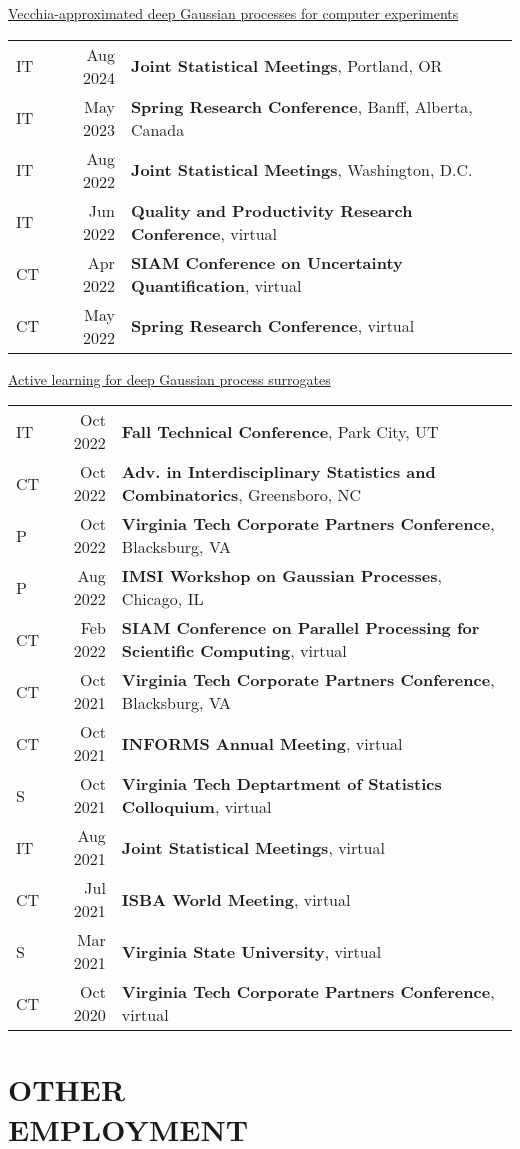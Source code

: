 \documentclass[margin,line,11pt]{res}
\begin{document}
\begin{resume}
\underline{Vecchia-approximated deep Gaussian processes for computer experiments}\\
\begin{tabular}{lrl}
IT & Aug 2024 & {\bf Joint Statistical Meetings}, Portland, OR \\
IT & May 2023 & {\bf Spring Research Conference}, Banff, Alberta, Canada \\
IT & Aug 2022 & {\bf Joint Statistical Meetings}, Washington, D.C. \\
IT & Jun 2022 & {\bf Quality and Productivity Research Conference}, virtual \\
CT & Apr 2022 & {\bf SIAM Conference on Uncertainty Quantification}, virtual \\
CT & May 2022 & {\bf Spring Research Conference}, virtual \\
\end{tabular}

\underline{Active learning for deep Gaussian process surrogates}\\
\begin{tabular}{lrl}
IT & Oct 2022 & {\bf Fall Technical Conference}, Park City, UT \\
CT & Oct 2022 & {\bf Adv. in Interdisciplinary Statistics and Combinatorics}, Greensboro, NC \\
P & Oct 2022 & {\bf Virginia Tech Corporate Partners Conference}, Blacksburg, VA \\
P & Aug 2022 & {\bf IMSI Workshop on Gaussian Processes}, Chicago, IL \\
CT & Feb 2022 & {\bf SIAM Conference on Parallel Processing for Scientific Computing}, virtual \\
CT & Oct 2021 & {\bf Virginia Tech Corporate Partners Conference}, Blacksburg, VA \\
CT & Oct 2021 & {\bf INFORMS Annual Meeting}, virtual \\
S & Oct 2021 & {\bf Virginia Tech Deptartment of Statistics Colloquium}, virtual \\
IT & Aug 2021 & {\bf Joint Statistical Meetings}, virtual \\
CT& Jul 2021 & {\bf ISBA World Meeting}, virtual \\
S & Mar 2021 & {\bf Virginia State University}, virtual \\
CT & Oct 2020 & {\bf Virginia Tech Corporate Partners Conference}, virtual \\
\end{tabular}

\medskip
\section{OTHER \\ EMPLOYMENT}


\end{resume}
\end{document}
